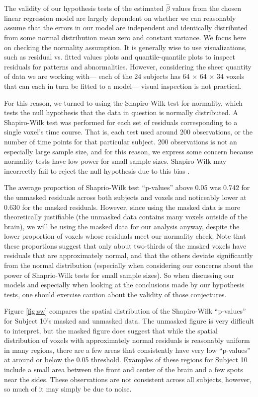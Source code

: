 \par \indent The validity of our hypothesis tests of the estimated 
$\hat{\beta}$ values from the chosen linear regression model are largely 
dependent on whether we can reasonably assume that the errors in our model 
are independent and identically distributed from some normal distribution 
mean zero and constant variance. We focus here on checking the normality 
assumption. It is generally wise to use visualizations, such as residual vs. 
fitted values plots and quantile-quantile plots to inspect residuals for 
patterns and abnormalities. However, considering the sheer quantity of data 
we are working with--- each of the 24 subjects has 64 $\times$ 64 $\times$ 34 
voxels that can each in turn be fitted to a model--- visual inspection is 
not practical. 

For this reason, we turned to using the Shapiro-Wilk test for normality, 
which tests the null hypothesis that the data in question is normally 
distributed. A Shapiro-Wilk test was performed for each set of residuals 
corresponding to a single voxel's time course. That is, each test used around 
200 observations, or the number of time points for that particular subject. 
200 observations is not an especially large sample size, and for this reason, 
we express some concern because normality tests have low power for small 
sample sizes. Shapiro-Wilk may incorrectly fail to reject the null hypothesis 
due to this bias \cite{ghasemi2012normality}. 

The average proportion of Shaprio-Wilk test ``p-values'' above 0.05 was 0.742 
for the unmasked residuals across both subjects and voxels and noticeably 
lower at 0.630 for the masked residuals. However, since using the masked data 
is more theoretically justifiable (the unmasked data contains many voxels 
outside of the brain), we will be using the masked data for our analysis 
anyway, despite the lower proportion of voxels whose residuals meet our 
normality check. Note that these proportions suggest that only about 
two-thirds of the masked voxels have residuals that are approximately normal, 
and that the others deviate significantly from the normal distribution 
(especially when considering our concerns about the power of Shaprio-Wilk 
tests for small sample sizes). So when discussing our models and especially 
when looking at the conclusions made by our hypothesis tests, one should 
exercise caution about the validity of those conjectures. 

Figure \ref{fig:sw} compares the spatial distribution of the Shapiro-Wilk 
``p-values'' for Subject 10's masked and unmasked data. The unmasked figure 
is very difficult to interpret, but the masked figure does suggest that while 
the spatial distribution of voxels with approximately normal residuals is 
reasonably uniform in many regions, there are a few areas that consistently 
have very low ``p-values'' at around or below the 0.05 threshold. Examples of 
these regions for Subject 10 include a small area between the front and center 
of the brain and a few spots near the sides. These observations are not 
consistent across all subjects, however, so much of it may simply be due to 
noise. 

